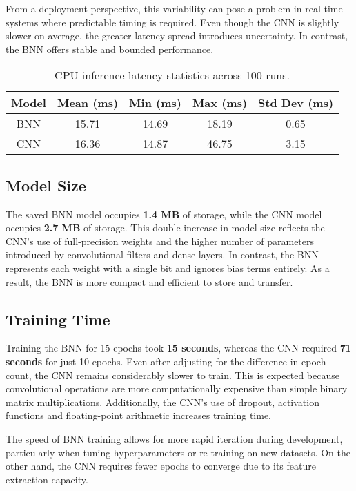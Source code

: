 \documentclass[a4paper,12pt]{report}
\begin{document}
From a deployment perspective, this variability can pose a problem in real-time systems where predictable timing is required. Even though the CNN is slightly slower on average, the greater latency spread introduces uncertainty. In contrast, the BNN offers stable and bounded performance.
\begin{table}[htbp]
    \centering
    \begin{tabular}{|c|c|c|c|c|}
        \hline
        \textbf{Model} & \textbf{Mean (ms)} & \textbf{Min (ms)} & \textbf{Max (ms)} & \textbf{Std Dev (ms)} \\
        \hline
        BNN & 15.71 & 14.69 & 18.19 & 0.65 \\
        \hline
        CNN & 16.36 & 14.87 & 46.75 & 3.15 \\
        \hline
    \end{tabular}
    \vspace{0.5\baselineskip}
    \caption{CPU inference latency statistics across 100 runs.}
    \label{table:cpu_inference_latency}
\end{table}

\subsection{Model Size}
The saved BNN model occupies \textbf{1.4 MB} of storage, while the CNN model occupies \textbf{2.7 MB} of storage. This double increase in model size reflects the CNN’s use of full-precision weights and the higher number of parameters introduced by convolutional filters and dense layers. In contrast, the BNN represents each weight with a single bit and ignores bias terms entirely. As a result, the BNN is more compact and efficient to store and transfer.

\subsection{Training Time}
Training the BNN for 15 epochs took \textbf{15 seconds}, whereas the CNN required \textbf{71 seconds} for just 10 epochs. Even after adjusting for the difference in epoch count, the CNN remains considerably slower to train. This is expected because convolutional operations are more computationally expensive than simple binary matrix multiplications. Additionally, the CNN's use of dropout, activation functions and floating-point arithmetic increases training time. 

The speed of BNN training allows for more rapid iteration during development, particularly when tuning hyperparameters or re-training on new datasets. On the other hand, the CNN requires fewer epochs to converge due to its feature extraction capacity.
\end{document}
